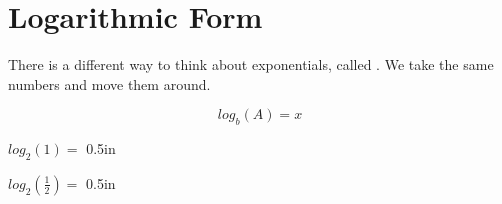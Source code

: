 \section{Logarithmic Form}

There is a different way to think about exponentials, called 
 .
We take the same numbers and move them around.
\begin{tcolorbox}[center,colback=white,width=3in]
    \Large
    \[ log_b(A) = x \]
\end{tcolorbox}

{
    $log_2(1) = $  
}
{0.5in}


\myProblem
{
    $log_2(\frac{1}{2}) = $  
}
{0.5in}

